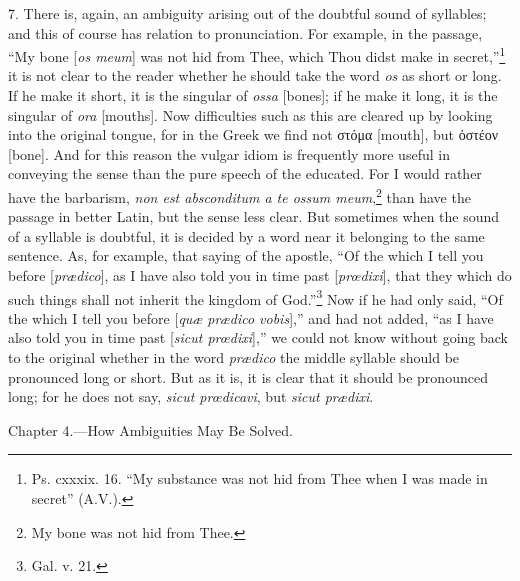 7. There is, again, an ambiguity arising out of the doubtful sound of syllables; and this of course has relation to pronunciation. For example, in the passage, “My bone [\emph{os meum}] was not hid from Thee, which Thou didst make in secret,”\footnote{Ps. cxxxix. 16. “My substance was not hid from Thee when I was made in secret” (A.V.).} it is not clear to the reader whether he should take the word \emph{os} as short or long. If he make it short, it is the singular of \emph{ ossa} [bones]; if he make it long, it is the singular of \emph{ ora} [mouths]. Now difficulties such as this are cleared up by looking into the original tongue, for in the Greek we find not \textgreek{στόμα} [mouth], but \textgreek{ὁστέον} [bone]. And for this reason the vulgar idiom is frequently more useful in conveying the sense than the pure speech of the educated. For I would rather have the barbarism, \emph{non est absconditum a te ossum meum},\footnote{My bone was not hid from Thee.} than have the passage in better Latin, but the sense less clear. But sometimes when the sound of a syllable is doubtful, it is decided by a word near it belonging to the same sentence. As, for example, that saying of the apostle, “Of the which I tell you before [\emph{prædico}], as I have also told you in time past [\emph{prœdixi}], that they which do such things shall not inherit the kingdom of God.”\footnote{Gal. v. 21.} Now if he had only said, “Of the which I tell you before [\emph{quæ prædico vobis}],” and had not added, “as I have also told you in time past [\emph{sicut prœdixi}],” we could not know without going back to the original whether in the word \emph{prædico} the middle syllable should be pronounced long or short. But as it is, it is clear that it should be pronounced long; for he does not say, \emph{sicut prœdicavi}, but \emph{sicut prædixi}.


Chapter 4.—How Ambiguities May Be Solved.

